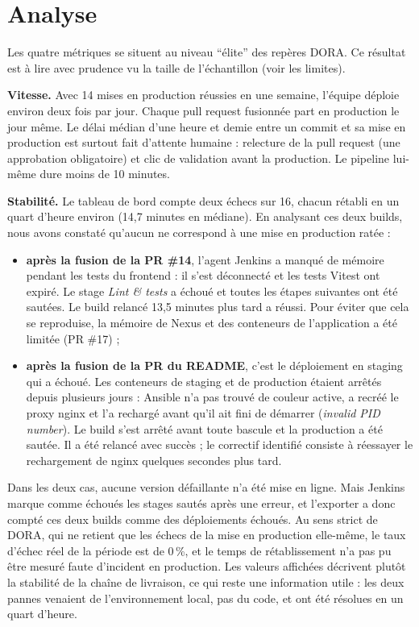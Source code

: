 \documentclass[11pt,a4paper]{report}
\begin{document}
\section{Analyse}
Les quatre métriques se situent au niveau \enquote{élite} des repères DORA. Ce résultat est à lire avec prudence vu la taille de l'échantillon (voir les limites).

\textbf{Vitesse.} Avec 14 mises en production réussies en une semaine, l'équipe déploie environ deux fois par jour. Chaque pull request fusionnée part en production le jour même. Le délai médian d'une heure et demie entre un commit et sa mise en production est surtout fait d'attente humaine : relecture de la pull request (une approbation obligatoire) et clic de validation avant la production. Le pipeline lui-même dure moins de 10 minutes.

\textbf{Stabilité.} Le tableau de bord compte deux échecs sur 16, chacun rétabli en un quart d'heure environ (14,7 minutes en médiane). En analysant ces deux builds, nous avons constaté qu'aucun ne correspond à une mise en production ratée :
\begin{itemize}
  \item \textbf{après la fusion de la PR \#14}, l'agent Jenkins a manqué de mémoire pendant les tests du frontend : il s'est déconnecté et les tests Vitest ont expiré. Le stage \emph{Lint \& tests} a échoué et toutes les étapes suivantes ont été sautées. Le build relancé 13,5 minutes plus tard a réussi. Pour éviter que cela se reproduise, la mémoire de Nexus et des conteneurs de l'application a été limitée (PR \#17) ;
  \item \textbf{après la fusion de la PR du README}, c'est le déploiement en staging qui a échoué. Les conteneurs de staging et de production étaient arrêtés depuis plusieurs jours : Ansible n'a pas trouvé de couleur active, a recréé le proxy nginx et l'a rechargé avant qu'il ait fini de démarrer (\emph{invalid PID number}). Le build s'est arrêté avant toute bascule et la production a été sautée. Il a été relancé avec succès ; le correctif identifié consiste à réessayer le rechargement de nginx quelques secondes plus tard.
\end{itemize}

Dans les deux cas, aucune version défaillante n'a été mise en ligne. Mais Jenkins marque comme échoués les stages sautés après une erreur, et l'exporter a donc compté ces deux builds comme des déploiements échoués. Au sens strict de DORA, qui ne retient que les échecs de la mise en production elle-même, le taux d'échec réel de la période est de 0\,\%, et le temps de rétablissement n'a pas pu être mesuré faute d'incident en production. Les valeurs affichées décrivent plutôt la stabilité de la chaîne de livraison, ce qui reste une information utile : les deux pannes venaient de l'environnement local, pas du code, et ont été résolues en un quart d'heure.
\end{document}
